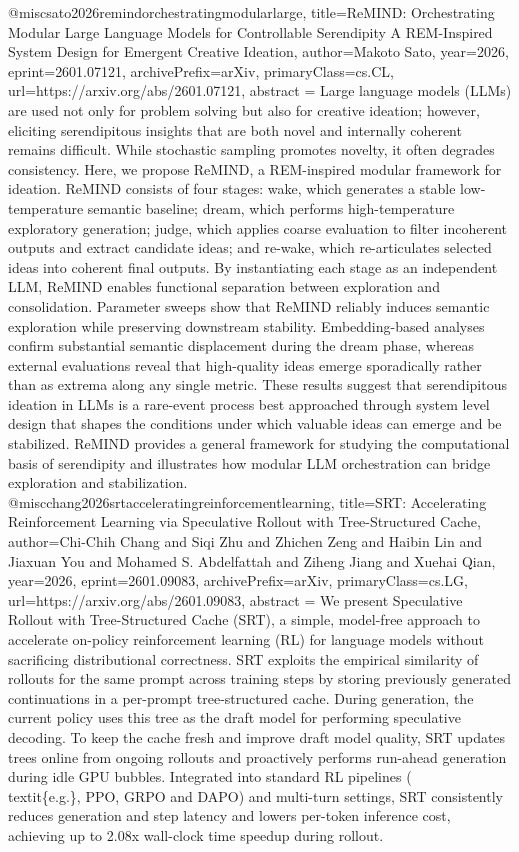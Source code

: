 {}@misc{sato2026remindorchestratingmodularlarge,
      title={ReMIND: Orchestrating Modular Large Language Models for Controllable Serendipity A REM-Inspired System Design for Emergent Creative Ideation}, 
      author={Makoto Sato},
      year={2026},
      eprint={2601.07121},
      archivePrefix={arXiv},
      primaryClass={cs.CL},
      url={https://arxiv.org/abs/2601.07121},
      abstract = {Large language models (LLMs) are used not only for problem solving but also for creative ideation; however, eliciting serendipitous insights that are both novel and internally coherent remains difficult. While stochastic sampling promotes novelty, it often degrades consistency. Here, we propose ReMIND, a REM-inspired modular framework for ideation. ReMIND consists of four stages: wake, which generates a stable low-temperature semantic baseline; dream, which performs high-temperature exploratory generation; judge, which applies coarse evaluation to filter incoherent outputs and extract candidate ideas; and re-wake, which re-articulates selected ideas into coherent final outputs. By instantiating each stage as an independent LLM, ReMIND enables functional separation between exploration and consolidation. Parameter sweeps show that ReMIND reliably induces semantic exploration while preserving downstream stability. Embedding-based analyses confirm substantial semantic displacement during the dream phase, whereas external evaluations reveal that high-quality ideas emerge sporadically rather than as extrema along any single metric. These results suggest that serendipitous ideation in LLMs is a rare-event process best approached through system level design that shapes the conditions under which valuable ideas can emerge and be stabilized. ReMIND provides a general framework for studying the computational basis of serendipity and illustrates how modular LLM orchestration can bridge exploration and stabilization.}
}@misc{chang2026srtacceleratingreinforcementlearning,
      title={SRT: Accelerating Reinforcement Learning via Speculative Rollout with Tree-Structured Cache}, 
      author={Chi-Chih Chang and Siqi Zhu and Zhichen Zeng and Haibin Lin and Jiaxuan You and Mohamed S. Abdelfattah and Ziheng Jiang and Xuehai Qian},
      year={2026},
      eprint={2601.09083},
      archivePrefix={arXiv},
      primaryClass={cs.LG},
      url={https://arxiv.org/abs/2601.09083},
      abstract = {We present Speculative Rollout with Tree-Structured Cache (SRT), a simple, model-free approach to accelerate on-policy reinforcement learning (RL) for language models without sacrificing distributional correctness. SRT exploits the empirical similarity of rollouts for the same prompt across training steps by storing previously generated continuations in a per-prompt tree-structured cache. During generation, the current policy uses this tree as the draft model for performing speculative decoding. To keep the cache fresh and improve draft model quality, SRT updates trees online from ongoing rollouts and proactively performs run-ahead generation during idle GPU bubbles. Integrated into standard RL pipelines (\\textit\{e.g.\}, PPO, GRPO and DAPO) and multi-turn settings, SRT consistently reduces generation and step latency and lowers per-token inference cost, achieving up to 2.08x wall-clock time speedup during rollout.}
}
